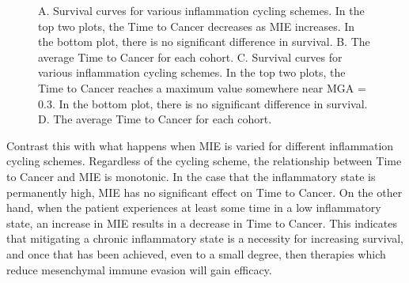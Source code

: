\documentclass[11pt, preprint]{article}
\begin{document}
\begin{figure}[H]
\center
{}
\caption{A. Survival curves for various inflammation cycling schemes. In the top two plots, the Time to Cancer decreases as MIE increases. In the bottom plot, there is no significant difference in survival.
B. The average Time to Cancer for each cohort.
C. Survival curves for various inflammation cycling schemes. In the top two plots, the Time to Cancer reaches a maximum value somewhere near MGA = 0.3. In the bottom plot, there is no significant difference in survival.
D. The average Time to Cancer for each cohort.}
\label{fig:VaryINFL_and_MesPars}
\end{figure}

Contrast this with what happens when MIE is varied for different inflammation cycling schemes.
Regardless of the cycling scheme, the relationship between Time to Cancer and MIE is monotonic.
In the case that the inflammatory state is permanently high, MIE has no significant effect on Time to Cancer.
On the other hand, when the patient experiences at least some time in a low inflammatory state, an increase in MIE results in a decrease in Time to Cancer.
This indicates that mitigating a chronic inflammatory state is a necessity for increasing survival, and once that has been achieved, even to a small degree, then therapies which reduce mesenchymal immune evasion will gain efficacy.


\end{document}
